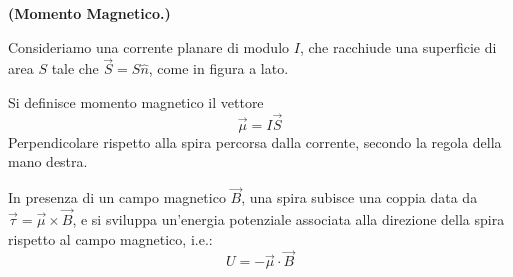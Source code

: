 \documentclass[../main.tex]{subfiles}
\begin{document}
\begin{definition}
    \textbf{(Momento Magnetico.)}
    
    Consideriamo una corrente planare di modulo $I$, che racchiude una superficie di area $S$ tale che \(\Vec{S} = S\hat{n}\), come in figura a lato.
    
    Si definisce momento magnetico il vettore 
    \begin{equation}
        \Vec{\mu} = I\Vec{S}
        \label{eq:magn_moment}
    \end{equation}
    Perpendicolare rispetto alla spira percorsa dalla corrente, secondo la regola della mano destra.
\end{definition}

In presenza di un campo magnetico $\Vec{B}$, una spira subisce una coppia data da \(\Vec\tau = \Vec\mu \times \Vec{B} \), e si sviluppa un'energia potenziale associata alla direzione della spira rispetto al campo magnetico, i.e.:
\begin{equation}
    \boxed{U = -\Vec\mu\cdot\Vec{B}}
    \label{eq:potential_energy_magn_mom}
\end{equation}
\end{document}
